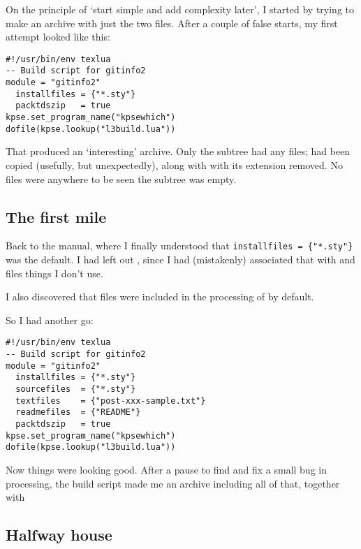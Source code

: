 \documentclass[]{ltugboat}
\begin{document}
On the principle of `start simple and add complexity later',
I started by trying to make an archive with 
just the two  files.
After a couple of false starts,
my first attempt looked like this:

\begin{verbatim}
#!/usr/bin/env texlua
-- Build script for gitinfo2
module = "gitinfo2"
  installfiles = {"*.sty"} 
  packtdszip   = true
kpse.set_program_name("kpsewhich")
dofile(kpse.lookup("l3build.lua"))
\end{verbatim}

That produced an `interesting' archive.
Only the  subtree had any files;
 had been copied (usefully, but unexpectedly), 
along with  with its extension removed. 
No  files were anywhere to be seen \Dash
the  subtree was empty.

\subsection{The first mile}
\label{sec:understanding-better}

Back to the manual, where I finally understood that
\verb!installfiles = {"*.sty"}!
was the default.
I had left out , 
since I had (mistakenly) associated that with 
 and  files 
\Dash things I don't use.

I also discovered that  files were included
in the processing of  by default.

So I had another go:

\begin{verbatim}
#!/usr/bin/env texlua
-- Build script for gitinfo2
module = "gitinfo2"
  installfiles = {"*.sty"} 
  sourcefiles  = {"*.sty"}
  textfiles    = {"post-xxx-sample.txt"}
  readmefiles  = {"README"}
  packtdszip   = true
kpse.set_program_name("kpsewhich")
dofile(kpse.lookup("l3build.lua"))
\end{verbatim}

Now things were looking good.
After a pause to find and fix a small bug in
 processing, 
the build script made me an archive including all of that,
together with  
   


\subsection{Halfway house}
\label{sec:halfway-house}
\end{document}
